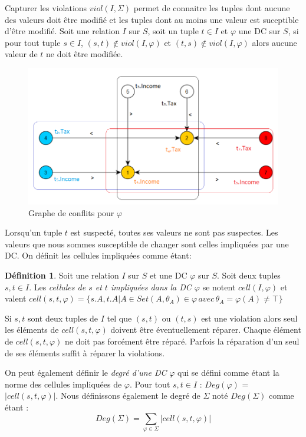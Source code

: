 \documentclass[letterpaper, 12pt]{report}
\theoremstyle{definition}
\newtheorem{mydef}{Définition}
\begin{document}
Capturer les violations $viol(I,\Sigma)$ permet de connaitre les tuples dont aucune des valeurs doit être modifié et les tuples dont au moins une valeur est suceptible d'être modifié. Soit une relation $I$ sur $S$, soit un tuple $t \in I$ et $\varphi$ une DC sur $S$, si pour tout tuple $s \in I$, $(s,t) \not \in viol(I,\varphi)$ et $(t,s) \not \in viol(I,\varphi)$ alors aucune valeur de $t$ ne doit être modifiée.\\

\begin{figure}
 \centering
 \includegraphics[scale=0.7]{img/grapht4.png}
 \caption{\label{grapht4} Graphe de conflits pour $\varphi$}
\end{figure}

Lorsqu'un tuple $t$ est suspecté, toutes ses valeurs ne sont pas suspectes. Les valeurs que nous sommes susceptible de changer sont celles impliquées par une DC. On définit les cellules impliquées comme étant:

\begin{mydef}
Soit une relation $I$ sur $S$ et une DC $\varphi$ sur $S$. Soit deux tuples $s,t \in I$. Les \emph{cellules de $s$ et $t$ impliquées dans la DC $\varphi$ } se notent $cell(I,\varphi)$ et valent $cell(s,t,\varphi) = \{s.A,t.A| A \in S et (A,\theta_A) \in \varphi\, avec\, \theta_A = \varphi(A) \not= \top \}$
\end{mydef}

Si $s,t$ sont deux tuples de $I$ tel que $(s,t)$ ou $(t,s)$ est une violation alors seul les éléments de $cell(s,t,\varphi)$ doivent être éventuellement réparer. Chaque élément de $cell(s,t,\varphi)$ ne doit pas forcément être réparé. Parfois la réparation d'un seul de ses éléments suffit à réparer la violations.

On peut également définir le \emph{degré d'une DC} $\varphi$ qui se défini comme étant la norme des cellules impliquées de $\varphi$. Pour tout $s,t \in I$ : $Deg(\varphi)$ = $ |cell(s,t,\varphi)|$. Nous définissons également le degré de $\Sigma$ noté $Deg(\Sigma)$ comme étant : $$Deg(\Sigma) = \sum_{\varphi \in \Sigma} |cell(s,t,\varphi)|$$
\end{document}
